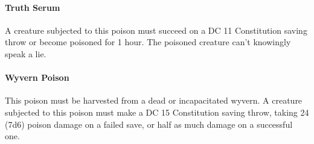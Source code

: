    \paragraph{Truth Serum}
        A creature subjected to this poison must succeed on a DC 11 Constitution saving throw or become poisoned for 1 hour.
        The poisoned creature can't knowingly speak a lie.
    \paragraph{Wyvern Poison}
        This poison must be harvested from a dead or incapacitated wyvern.
        A creature subjected to this poison must make a DC 15 Constitution saving throw, taking 24 (7d6) poison damage on a failed save, or half as much damage on a successful one.
\newpage~\newpage
